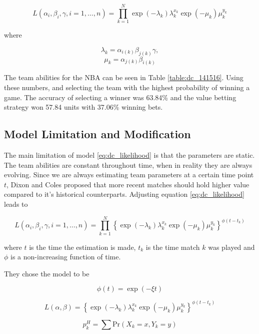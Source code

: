 \begin{equation} \label{eq:dc_likelihood}
L(\alpha_i,\beta_i,\gamma, i=1,\ldots,n) = \prod_{k=1}^{N} \exp(-\lambda_k)\lambda_{k}^{x_k}\exp(-\mu_k)\mu_{k}^{y_k}
\end{equation}

where

$$\lambda_k = \alpha_{i(k)}\beta_{j(k)}\gamma,$$
$$\mu_k = \alpha_{j(k)}\beta_{i(k)}$$

The team abilities for the NBA can be seen in Table \ref{table:dc_141516}.  Using these numbers, and selecting the team with the highest probability of winning a game.  The accuracy of selecting a winner was 63.84\% and the value betting strategy won 57.84 units with 37.06\% winning bets.




\subsection{Model Limitation and Modification}

The main limitation of model \ref{eq:dc_likelihood} is that the parameters are static.  The team abilities are constant throughout time, when in reality they are always evolving.  Since we are always estimating team parameters at a certain time point $t$, Dixon and Coles proposed that more recent matches should hold higher value compared to it's historical counterparts.  Adjusting equation \ref{eq:dc_likelihood} leads to

\begin{equation} \label{eq:dc_likelihood_time}
L(\alpha_i,\beta_i,\gamma, i=1,\ldots,n) = \prod_{k=1}^{N} \left\lbrace \exp(-\lambda_k)\lambda_{k}^{x_k}\exp(-\mu_k)\mu_{k}^{y_k}\right\rbrace ^{\phi(t-t_k)}
\end{equation}

where $t$ is the time the estimation is made, $t_k$ is the time match $k$ was played and $\phi$ is a non-increasing function of time.


They chose the model to be

$$\phi(t) = \exp(-\xi t)$$

\begin{equation}
	L(\alpha, \beta) = \left\lbrace \exp(-\lambda_k) \lambda_{k}^{x_k}\exp(-\mu_{k})\mu_k^{y_k}\right\rbrace^{\phi(t-t_k)} 
\end{equation}

\begin{equation} \label{eq:home_prob}
	p_k^H = \sum \text{Pr}(X_k = x, Y_k = y) 
\end{equation}

